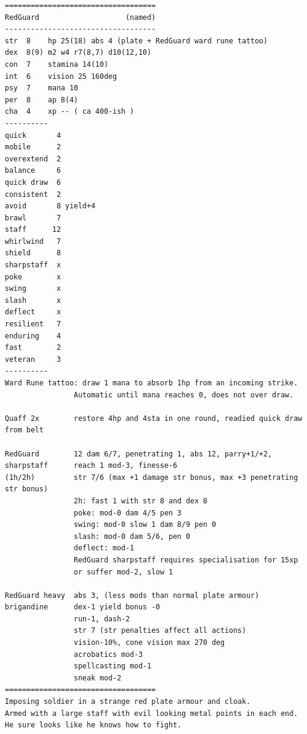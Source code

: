 \goodbreak \begin{samepage} \vsmall \begin{verbatim}
===================================
RedGuard                    (named)
-----------------------------------
str  8    hp 25(18) abs 4 (plate + RedGuard ward rune tattoo)
dex  8(9) m2 w4 r7(8,7) d10(12,10)
con  7    stamina 14(10)
int  6    vision 25 160deg
psy  7    mana 10
per  8    ap 8(4)
cha  4    xp -- ( ca 400-ish )
----------
quick       4
mobile      2
overextend  2
balance     6
quick draw  6
consistent  2
avoid       8 yield+4
brawl       7
staff      12
whirlwind   7
shield      8
sharpstaff  x
poke        x
swing       x
slash       x
deflect     x
resilient   7
enduring    4
fast        2
veteran     3
----------
Ward Rune tattoo: draw 1 mana to absorb 1hp from an incoming strike.
                Automatic until mana reaches 0, does not over draw.

Quaff 2x        restore 4hp and 4sta in one round, readied quick draw from belt

RedGuard        12 dam 6/7, penetrating 1, abs 12, parry+1/+2,
sharpstaff      reach 1 mod-3, finesse-6
(1h/2h)         str 7/6 (max +1 damage str bonus, max +3 penetrating str bonus)
                2h: fast 1 with str 8 and dex 8
                poke: mod-0 dam 4/5 pen 3
                swing: mod-0 slow 1 dam 8/9 pen 0
                slash: mod-0 dam 5/6, pen 0
                deflect: mod-1
                RedGuard sharpstaff requires specialisation for 15xp
                or suffer mod-2, slow 1

RedGuard heavy  abs 3, (less mods than normal plate armour)
brigandine      dex-1 yield bonus -0
                run-1, dash-2
                str 7 (str penalties affect all actions)
                vision-10%, cone vision max 270 deg
                acrobatics mod-3
                spellcasting mod-1
                sneak mod-2
===================================
Imposing soldier in a strange red plate armour and cloak.
Armed with a large staff with evil looking metal points in each end.
He sure looks like he knows how to fight.
\end{verbatim} \normalsize \end{samepage}

\

